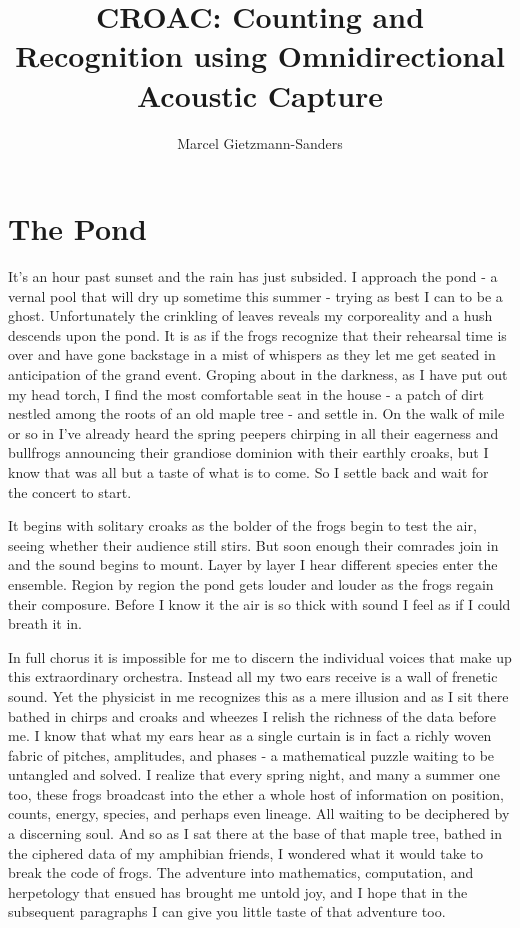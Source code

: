 \documentclass[10pt,a4paper]{article}
\title{CROAC: Counting and Recognition using Omnidirectional Acoustic Capture}
\author{Marcel Gietzmann-Sanders}
\begin{document}
\maketitle
\tableofcontents
\newpage
\section{The Pond}
It's an hour past sunset and the rain has just subsided. I approach the pond - a vernal pool that will dry up sometime this summer - trying as best I can to be a ghost. Unfortunately the crinkling of leaves reveals my corporeality and a hush descends upon the pond. It is as if the frogs recognize that their rehearsal time is over and have gone backstage in a mist of whispers as they let me get seated in anticipation of the grand event. Groping about in the darkness, as I have put out my head torch, I find the most comfortable seat in the house - a patch of dirt nestled among the roots of an old maple tree - and settle in. On the walk of mile or so in I've already heard the spring peepers chirping in all their eagerness and bullfrogs announcing their grandiose dominion with their earthly croaks, but I know that was all but a taste of what is to come. So I settle back  and wait for the concert to start.

It begins with solitary croaks as the bolder of the frogs begin to test the air, seeing whether their audience still stirs. But soon enough their comrades join in and the sound begins to mount. Layer by layer I hear different species enter the ensemble. Region by region the pond gets louder and louder as the frogs regain their composure. Before I know it the air is so thick with sound I feel as if I could breath it in. 

In full chorus it is impossible for me to discern the individual voices that make up this extraordinary orchestra. Instead all my two ears receive is a wall of frenetic sound. Yet the physicist in me recognizes this as a mere illusion and as I sit there bathed in chirps and croaks and wheezes I relish the richness of the data before me. I know that what my ears hear as a single curtain is in fact a richly woven fabric of pitches, amplitudes, and phases - a mathematical puzzle waiting to be untangled and solved. I realize that every spring night, and many a summer one too, these frogs broadcast into the ether a whole host of information on position, counts, energy, species, and perhaps even lineage. All waiting to be deciphered by a discerning soul. And so as I sat there at the base of that maple tree, bathed in the ciphered data of my amphibian friends, I wondered what it would take to break the code of frogs. The adventure into mathematics, computation, and herpetology that ensued has brought me untold joy, and I hope that in the subsequent paragraphs I can give you little taste of that adventure too. 
\newpage
\end{document}
